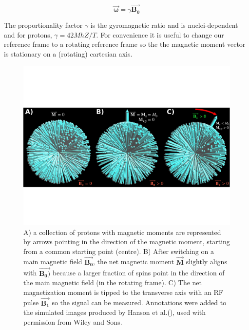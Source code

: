 \begin{equation}
	\vec{\mathbf{\omega}} = \gamma \vec{\mathbf{B_0}}
\end{equation}

The proportionality factor $\gamma$ is the gyromagnetic ratio and is nuclei-dependent and for protons, $\gamma = 42 MhZ /T$.
For convenience it is useful to change our reference frame to a rotating reference frame so the the magnetic moment vector is stationary on a (rotating) cartesian axis.

\begin{figure}
	\centering
	\includegraphics[width=\textwidth]{./intro/intro-images/HansonMRI.pdf}
	\caption{A) a collection of protons with magnetic moments are represented by arrows pointing in the direction of the magnetic moment, starting from a common starting point (centre). B) After switching on a main magnetic field $\vec{\mathbf{B_0}}$, the net magnetic moment $\vec{\mathbf{M}}$ slightly aligns with $\vec{\mathbf{B_0)}}$ because a larger fraction of spins point in the direction of the main magnetic field (in the rotating frame). C) The net magnetization moment is tipped to the transverse axis with an RF pulse $\vec{\mathbf{B_1}}$ so the signal can be measured. 
Annotations were added to the simulated images produced by Hanson et al.(\cite{Hanson:2008tp}), used with permission from Wiley and Sons.}
	\label{spinsB0B1}
\end{figure}

